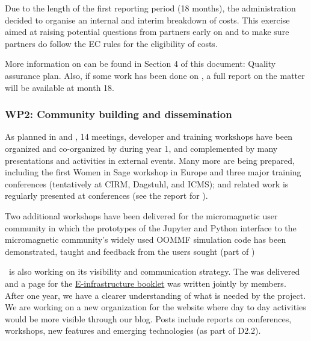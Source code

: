 \documentclass{deliverablereport}
\begin{document}
Due to the length of the first reporting period (18 months), the
 administration decided to organise an internal and interim
breakdown of costs. This exercise aimed at raising potential questions
from partners early on and to make sure partners do follow the EC
rules for the eligibility of costs.

More information on
 can be found in
Section 4 of this document: Quality assurance plan.  Also, if some
work has been done on
, a full report
on the matter will be available at month 18.



\subsubsection{WP2: Community building and dissemination}

As planned in  and
, 14 meetings, developer and
training workshops have been organized and co-organized by \ODK during
year 1, and complemented by many presentations and activities in
external events.  Many more are being prepared, including the first
Women in Sage workshop in Europe and three major training conferences
(tentatively at CIRM, Dagstuhl, and ICMS); \ODK and \ODK related work
is regularly presented at conferences (see the report for
).

Two additional workshops have been delivered for the micromagnetic user community
in which the prototypes of the Jupyter and Python interface to the
micromagnetic community's widely used OOMMF simulation code has been demonstrated,
taught and feedback from the users sought (part of
)

\ODK\ is also working on its visibility and communication strategy. The
 was delivered and a page for
the
\href{https://github.com/OpenDreamKit/OpenDreamKit/blob/master/Communication/eInfra-Booklet/ODK.md}{E-infrastructure
  booklet} was written jointly by \ODK members. After one year, we
have a clearer understanding of what is needed by the project.  We are
working on a new organization for the website where day to day
activities would be more visible through our blog. Posts include
reports on conferences, workshops, new features and emerging
technologies (as part of D2.2).
\end{document}
